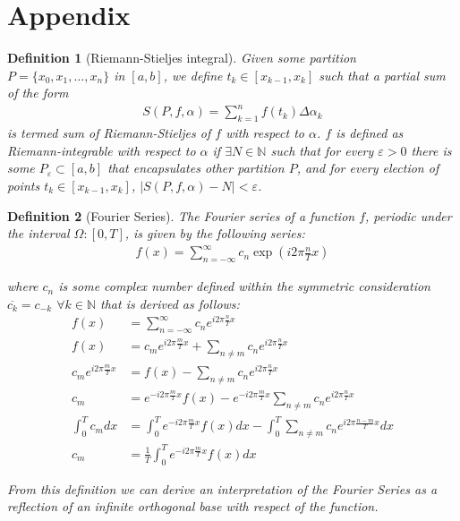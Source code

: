 \documentclass[12pt]{article}
\newtheorem{definition}{Definition}
\begin{document}
\section{Appendix}


\begin{definition}[Riemann-Stieljes integral]
    Given some partition $P = \{x_0, x_1, \ldots, x_n\}$ in $[a, b]$, we define $t_k \in [x_{k-1}, x_k]$ such that a partial sum of the form
    \begin{align*}
        S(P, f, \alpha) = \sum_{k = 1}^n f(t_k) \Delta \alpha_k
    \end{align*}
    is termed sum of Riemann-Stieljes of $f$ with respect to $\alpha$. $f$ is defined as Riemann-integrable with respect to $\alpha$ if $\exists N \in \mathbb{N}$ such that for every $\varepsilon > 0$ there is some $P_\varepsilon \subset [a, b]$ that encapsulates other partition $P$, and for every election of points $t_k \in [x_{k-1}, x_k]$, $\mid S(P, f, \alpha) - N \mid < \varepsilon$.
\end{definition}

\begin{definition}[Fourier Series]
    The Fourier series of a function $f$, periodic under the interval $\Omega : [0, T]$, is given by the following series:
    \begin{align*}
        f(x) = \sum_{n = -\infty}^\infty c_n \exp \left( i 2\pi \frac{n}{T} x\right)
    \end{align*}

    where $c_n$ is some complex number defined within the symmetric consideration $\overline{c_k} = c_{-k}$ $ \forall k \in \mathbb{N}$ that is derived as follows:
    \begin{align*}
        f(x) &= \sum_{n = -\infty}^\infty c_n  e^{i 2\pi \frac{n}{T} x} \\
        f(x) &= c_m e^{i 2\pi \frac{m}{T} x} + \sum_{n \neq m} c_n e^{i 2\pi \frac{n}{T} x} \\
        c_m e^{i 2\pi \frac{m}{T} x} &= f(x) - \sum_{n \neq m} c_n e^{i 2\pi \frac{n}{T} x} \\
        c_m &= e^{- i 2\pi \frac{m}{T} x} f(x) - e^{-i 2\pi \frac{m}{T} x} \sum_{n \neq m} c_n e^{i 2\pi \frac{n}{T} x} \\
        \int_0^T c_m dx &= \int_0^Te^{- i 2\pi \frac{m}{T} x} f(x)dx  - \int_0^T \sum_{n \neq m} c_n e^{i 2\pi \frac{n - m}{T} x} dx\\
        c_m &= \frac{1}{T} \int_0^Te^{- i 2\pi \frac{m}{T} x} f(x)dx
    \end{align*}

From this definition we can derive an interpretation of the Fourier Series as a reflection of an infinite orthogonal base with respect of the function.
\end{definition}
\end{document}
